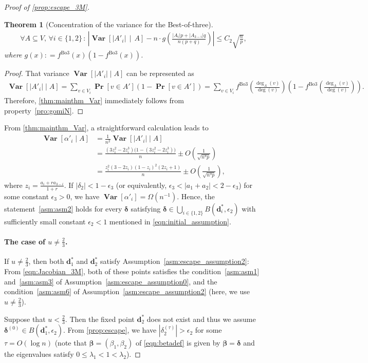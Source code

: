 \documentclass[letterpaper,11pt]{article}
\newtheorem{theorem}{Theorem}[section]
\newcommand{\Bthree}{\mathrm{Bo3}}
\renewcommand\Pr{\mathop{\mathbf{Pr}}}
\newcommand{\Var}{\mathop{\mathbf{Var}}}%
\def\defeq{\mathrel{\mathop:}=}%
\begin{document}
\begin{proof}[Proof of \cref{prop:escape_3M}]
\begin{theorem}[Concentration of the variance for the Best-of-three]
\begin{align*}
\forall A\subseteq V, \, \forall i\in\{1,2\}\,:\,
\left|\Var\left[|A'_i|\,\middle|\, A \right]
-
n\cdot g\left(\frac{|A_i|p+|A_{3-i}|q}{n(p+q)}\right)
\right| \leq C_2\sqrt{\frac{n}{p}},
\end{align*}
where $g(x)\defeq f^{\Bthree}(x)(1-f^{\Bthree}(x))$.
\end{theorem}
\begin{proof}
That variance $\Var[|A'_i| \mid A]$ can be represented as
\begin{align*}
\Var[|A'_i| \mid A]
 = \sum_{v\in V_i} \Pr[v\in A'](1-\Pr[v\in A'])
 = \sum_{v\in V_i} f^{\Bthree}\left(\frac{\deg_A(v)}{\deg(v)}\right) \left(1-f^{\Bthree}\left(\frac{\deg_A(v)}{\deg(v)}\right)\right).
\end{align*}
Therefore, \cref{thm:mainthm_Var} immediately follows from property~\ref{pro:gomiN}.
\end{proof}
From \cref{thm:mainthm_Var}, a straightforward calculation leads to
\begin{align*}
\Var[\alpha'_i \mid A]
&= \frac{1}{n^2}\Var[|A'_i| \mid A] \\
&= \frac{(3z_i^2-2z_i^3)\bigl(1-(3z_i^2-2z_i^3)\bigr)}{n} \pm O\left(\frac{1}{\sqrt{n^3p}}\right) \\
&=\frac{z_i^2(3-2z_i)(1-z_i)^2(2z_i+1)}{n} \pm O\left(\frac{1}{\sqrt{n^3p}}\right),
\end{align*}
where $z_i=\frac{a_i+ra_{3-i}}{1+r}$.
If $|\delta_2|<1-\epsilon_3$ (or equivalently, $\epsilon_3<|a_1+a_2|<2-\epsilon_3$) for some constant $\epsilon_3>0$, we have $\Var[\alpha'_i]=\Omega(n^{-1})$.
Hence, the statement~\ref{asm:asm2} holds for every ${\boldsymbol \delta}$ satisfying ${\boldsymbol \delta} \in \bigcup_{i\in\{1,2\}}B(\mathbf{d}^*_i,\epsilon_2)$ with sufficiently small constant $\epsilon_2<1$ mentioned in \cref{eqn:initial_assumption}.


\paragraph*{The case of $u\neq\frac{2}{3}$.}
If $u\neq\frac{2}{3}$, then both $\mathbf{d}^*_1$ and $\mathbf{d}^*_2$ satisfy Assumption~\ref{asm:escape_assumption2}:
From \cref{eqn:Jacobian_3M}, both of these points satisfies the condition~\ref{asm:asm1} and~\ref{asm:asm3} of Assumption~\ref{asm:escape_assumption0}, and the condition~\ref{asm:asm6} of Assumption~\ref{asm:escape_assumption2} (here, we use $u\neq\frac{2}{3}$).

Suppose that $u<\frac{2}{3}$.
Then the fixed point $\mathbf{d}^*_2$ does not exist and thus we assume ${\boldsymbol \delta}^{(0)} \in B(\mathbf{d}^*_1,\epsilon_2)$.
From \cref{prop:escape}, we have $|\delta_2^{(\tau)}|>\epsilon_2$ for some $\tau=O(\log n)$ (note that ${\boldsymbol \beta}=(\beta_1,\beta_2)$ of \cref{eqn:betadef} is given by ${\boldsymbol \beta}={\boldsymbol \delta}$ and the eigenvalues satisfy $0\leq \lambda_1 < 1 < \lambda_2$).


\end{proof}
\end{document}
